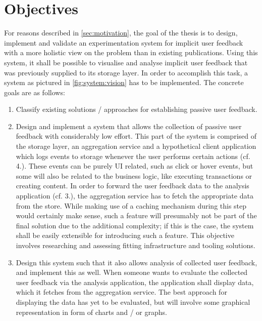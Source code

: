 %
\chapter{Objectives}
\label{sec:objectives}

For reasons described in \cref{sec:motivation}, the goal of the thesis is to design, implement and validate an experimentation system for implicit user feedback with a more holistic view on the problem than in existing publications.
Using this system, it shall be possible to visualise and analyse implicit user feedback that was previously supplied to its storage layer.
In order to accomplish this task, a system as pictured in \cref{fig:system:vision} has to be implemented.
The concrete goals are as follows:

\begin{enumerate}
\item Classify existing solutions / approaches for establishing passive user feedback.
\item Design and implement a system that allows the collection of passive user feedback with considerably low effort.
This part of the system is comprised of the storage layer, an aggregation service and a hypothetical client application which logs events to storage whenever the user performs certain actions (cf. 4.).
These events can be purely UI related, such as click or hover events, but some will also be related to the business logic, like executing transactions or creating content.
In order to forward the user feedback data to the analysis application (cf. 3.), the aggregation service has to fetch the appropriate data from the store.
While making use of a caching mechanism during this step would certainly make sense, such a feature will presumably not be part of the final solution due to the additional complexity; if this is the case, the system shall be easily extensible for introducing such a feature.
This objective involves researching and assessing fitting infrastructure and tooling solutions.
\item Design this system such that it also allows analysis of collected user feedback, and implement this as well.
When someone wants to evaluate the collected user feedback via the analysis application, the application shall display data, which it fetches from the aggregation service.
The best approach for displaying the data has yet to be evaluated, but will involve some graphical representation in form of charts and / or graphs.

\end{enumerate}

